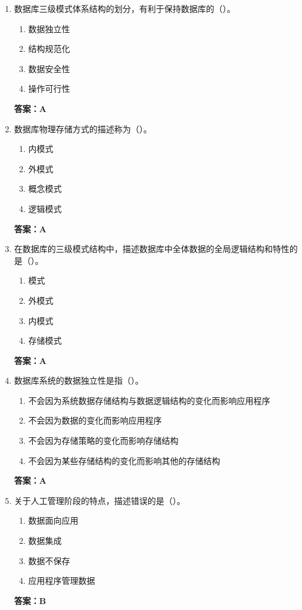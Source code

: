 \documentclass[12pt, a4paper]{article}
\begin{document}
\begin{enumerate}[label=\arabic*.]
	\item 数据库三级模式体系结构的划分，有利于保持数据库的（\quad）。
	      \begin{enumerate}
		      \item 数据独立性
		      \item 结构规范化
		      \item 数据安全性
		      \item 操作可行性
	      \end{enumerate}
	      \textbf{答案：A}

	\item 数据库物理存储方式的描述称为（\quad）。
	      \begin{enumerate}
		      \item 内模式
		      \item 外模式
		      \item 概念模式
		      \item 逻辑模式
	      \end{enumerate}
	      \textbf{答案：A}

	\item 在数据库的三级模式结构中，描述数据库中全体数据的全局逻辑结构和特性的是（\quad）。
	      \begin{enumerate}
		      \item 模式
		      \item 外模式
		      \item 内模式
		      \item 存储模式
	      \end{enumerate}
	      \textbf{答案：A}

	\item 数据库系统的数据独立性是指（\quad）。
	      \begin{enumerate}
		      \item 不会因为系统数据存储结构与数据逻辑结构的变化而影响应用程序
		      \item 不会因为数据的变化而影响应用程序
		      \item 不会因为存储策略的变化而影响存储结构
		      \item 不会因为某些存储结构的变化而影响其他的存储结构
	      \end{enumerate}
	      \textbf{答案：A}

	\item 关于人工管理阶段的特点，描述错误的是（\quad）。
	      \begin{enumerate}
		      \item 数据面向应用
		      \item 数据集成
		      \item 数据不保存
		      \item 应用程序管理数据
	      \end{enumerate}
	      \textbf{答案：B}


\end{enumerate}
\end{document}
